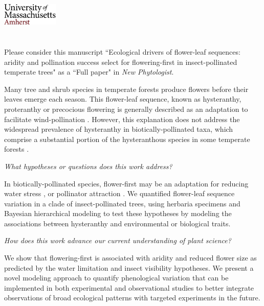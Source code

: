 \documentclass{article}[12pt]
\begin{document}

\noindent\includegraphics[width=0.2\textwidth]{umasslogo}\\\\

\\


\noindent Please consider this manuscript ``Ecological drivers of flower-leaf sequences: aridity and pollination success select for flowering-first in insect-pollinated temperate trees" as a ``Full paper" in \textit{New Phytologist}.

\noindent Many tree and shrub species in temperate forests produce flowers before their leaves emerge each season. This flower-leaf sequence, known as hysteranthy, proteranthy or precocious flowering is generally described as an adaptation to facilitate wind-pollination \citep{Rathcke_1985}. However, this explanation does not address the widespread prevalence of hysteranthy in biotically-pollinated taxa, which comprise a substantial portion of the hysteranthous species in some temperate forests \citep{Buonaiuto2020}. 

\noindent \emph{What hypotheses or questions does this work address?}

\noindent In biotically-pollinated species, flower-first may be an adaptation for reducing water stress \citep[\textbf{Water limitation hypothesis};][]{Gougherty2018,Buonaiuto2020}, or pollinator attraction \citep[\textbf{Insect visibility hypothesis};][]{Janzen1967}. We quantified flower-leaf sequence variation in a clade of insect-pollinated trees, using herbaria specimens and Bayesian hierarchical modeling to test these hypotheses by modeling the associations between hysteranthy and environmental or biological traits.

\noindent \emph{How does this work advance our current understanding of plant science?}

\noindent We show that flowering-first is associated with aridity and reduced flower size as predicted by the water limitation and insect visibility hypotheses. We present a novel modeling approach to quantify phenological variation that can be implemented in both experimental and observational studies to better integrate observations of broad ecological patterns with targeted experiments in the future.
\end{document}
